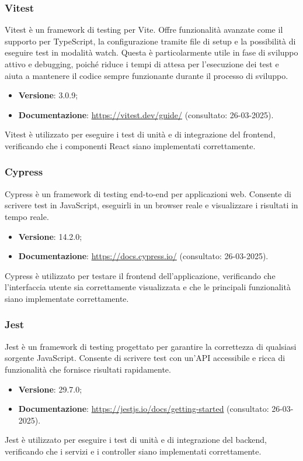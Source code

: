 \subsubsection{Vitest}
Vitest è un framework di testing per Vite. Offre funzionalità avanzate come il
supporto per TypeScript, la configurazione tramite file di setup e la
possibilità di eseguire test in modalità watch. Questa è particolarmente utile
in fase di sviluppo attivo e debugging, poiché riduce i tempi di attesa per
l'esecuzione dei test e aiuta a mantenere il codice sempre funzionante durante
il processo di sviluppo.
\begin{itemize}
    \item \textbf{Versione}: 3.0.9;
    \item \textbf{Documentazione}: \url{https://vitest.dev/guide/} (consultato:
          26-03-2025).
\end{itemize}
Vitest è utilizzato per eseguire i test di unità e di integrazione del frontend,
verificando che i componenti React siano implementati correttamente.

\subsubsection{Cypress}
Cypress è un framework di testing end-to-end per applicazioni web. Consente di
scrivere test in JavaScript, eseguirli in un browser reale e visualizzare i
risultati in tempo reale.
\begin{itemize}
    \item \textbf{Versione}: 14.2.0;
    \item \textbf{Documentazione}: \url{https://docs.cypress.io/} (consultato:
          26-03-2025).
\end{itemize}
Cypress è utilizzato per testare il frontend dell'applicazione, verificando che
l'interfaccia utente sia correttamente visualizzata e che le principali funzionalità
siano implementate correttamente.

\subsubsection{Jest}
Jest è un framework di testing progettato per garantire la correttezza di
qualsiasi sorgente JavaScript. Consente di scrivere test con un'API
accessibile e ricca di funzionalità che fornisce risultati rapidamente.
\begin{itemize}
    \item \textbf{Versione}: 29.7.0;
    \item \textbf{Documentazione}: \url{https://jestjs.io/docs/getting-started} (consultato:
          26-03-2025).
\end{itemize}
Jest è utilizzato per eseguire i test di unità e di integrazione del backend,
verificando che i servizi e i controller siano implementati correttamente.